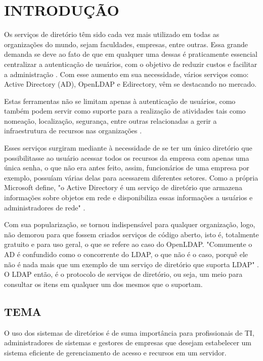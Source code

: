 \newpage

\section{INTRODUÇÃO}
\label{sec:introdução}
Os serviços de diretório têm sido cada vez mais utilizado em todas as
organizações do mundo, sejam faculdades, empresas, entre outras. Essa
grande demanda se deve ao fato de que em qualquer uma dessas é praticamente essencial centralizar a autenticação de usuários, com o objetivo de reduzir custos e facilitar a administração \cite{berbelini}. Com esse aumento em sua necessidade, vários serviços como: Active Directory (AD), OpenLDAP e Edirectory, vêm se destacando no mercado.

Estas ferramentas não se limitam apenas à autenticação de usuários, como também podem servir como suporte para a realização de atividades tais como nomeação, localização, segurança, entre outras relacionadas a gerir a infraestrutura de recursos nas organizações \cite{cruz2023}.

Esses serviços surgiram mediante à necessidade de se ter um único diretório que possibilitasse ao usuário acessar todos os recursos da empresa com apenas uma única senha, o que não era antes feito, assim, funcionários de uma empresa por exemplo, possuíam várias delas para acessarem diferentes setores. Como a própria Microsoft define, "o  Active  Directory é  um  serviço  de  diretório  que  armazena  informações sobre objetos em rede e disponibiliza essas informações a usuários e administradores de rede" \cite{microsoftlearn}.

Com sua popularização, se tornou indispensável para qualquer organização, logo,  não demorou para que fossem criados serviços de código aberto, isto é, totalmente gratuito e para uso geral, o que se refere ao caso do OpenLDAP. "Comumente o AD é confundido como o concorrente do LDAP, o que não é o caso, porquê ele não é nada mais que um exemplo de um serviço de diretório que suporta LDAP" \cite{bertolli}. O LDAP então, é o protocolo de serviços de diretório, ou seja, um meio para consultar os itens em qualquer um dos mesmos que o suportam.


\subsection{TEMA}
\label{subsec:tema}
O uso dos sistemas de diretórios é de suma importância para profissionais de TI, administradores de sistemas e gestores de empresas que desejam estabelecer um sistema eficiente de gerenciamento de acesso e recursos em um servidor.

